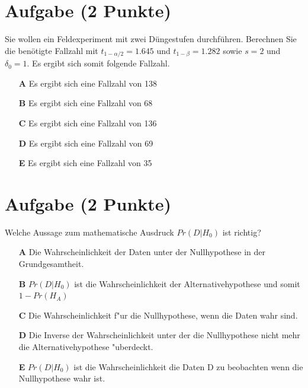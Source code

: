 \documentclass[a4paper, 10pt]{scrartcl}\usepackage[]{graphicx}\usepackage[]{xcolor}
\begin{document}
\section{Aufgabe \hfill (2 Punkte)}




Sie wollen ein Feldexperiment mit zwei D{\"u}ngestufen durchf{\"u}hren. Berechnen
Sie die ben{\"o}tigte Fallzahl mit $t_{1-\alpha/2} = 1.645$ und
$t_{1-\beta} = 1.282$ sowie $s = 2$ und
$\delta_0 = 1$. Es ergibt sich somit folgende Fallzahl.



\begin{enumerate}
\item [\textbf{A} \msquare] Es ergibt sich eine Fallzahl von 138
\item [\textbf{B} \msquare] Es ergibt sich eine Fallzahl von 68
\item [\textbf{C} \msquare] Es ergibt sich eine Fallzahl von 136
\item [\textbf{D} \msquare] Es ergibt sich eine Fallzahl von 69
\item [\textbf{E} \msquare] Es ergibt sich eine Fallzahl von 35
\end{enumerate}

\section{Aufgabe \hfill (2 Punkte)}

Welche Aussage zum mathematische Ausdruck $Pr(D|H_0)$ ist richtig? 



\begin{enumerate}
\item [\textbf{A} \msquare] Die Wahrscheinlichkeit der Daten unter der Nullhypothese in der Grundgesamtheit.
\item [\textbf{B} \msquare] $Pr(D|H_0)$ ist die Wahrscheinlichkeit der Alternativehypothese und somit $1 - Pr(H_A)$
\item [\textbf{C} \msquare] Die Wahrscheinlichkeit f{"u}r die Nullhypothese, wenn die Daten wahr sind.
\item [\textbf{D} \msquare] Die Inverse der Wahrscheinlichkeit unter der die Nullhypothese nicht mehr die Alternativehypothese {"u}berdeckt.
\item [\textbf{E} \msquare] $Pr(D|H_0)$ ist die Wahrscheinlichkeit die Daten D zu beobachten wenn die Nullhypothese wahr ist.
\end{enumerate}
\end{document}
